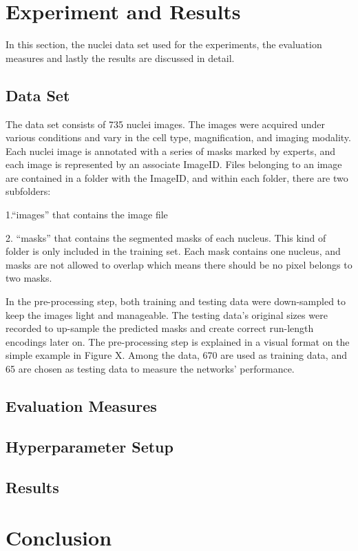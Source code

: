 \documentclass{article}
\begin{document}
\section{Experiment and Results}
In this section, the nuclei data set used for the experiments, the evaluation measures and lastly the results are discussed in detail.
\subsection{Data Set}
The data set consists of 735 nuclei images.
The images were acquired under various conditions and vary in the cell type, magnification, and imaging modality.
Each nuclei image is annotated with a series of masks marked by experts, and each image is represented by an associate ImageID.
Files belonging to an image are contained in a folder with the ImageID, and within each folder, there are two subfolders:

1.“images” that contains the image file

2. “masks” that contains the segmented masks of each nucleus.
This kind of folder is only included in the training set.
Each mask contains one nucleus, and masks are not allowed to overlap which means there should be no pixel belongs to two masks.

In the pre-processing step, both training and testing data were down-sampled to keep the images light and manageable.
The testing data's original sizes were recorded to up-sample the predicted masks and create correct run-length encodings later on.
The pre-processing step is explained in a visual format on the simple example in Figure X. Among the data, 670 are used as training data, and 65 are chosen as testing data to measure the networks' performance.

\subsection{Evaluation Measures}

\subsection{Hyperparameter Setup}
\subsection{Results}

\section{Conclusion}



\end{document}
